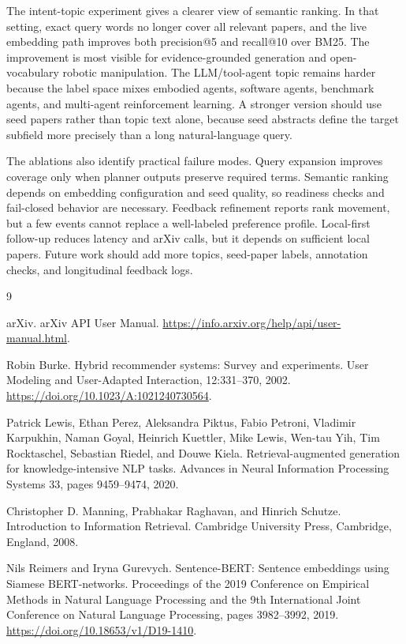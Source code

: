 \documentclass{article}
\begin{document}
The intent-topic experiment gives a clearer view of semantic ranking. In that setting, exact query words no longer cover all relevant papers, and the live embedding path improves both precision@5 and recall@10 over BM25. The improvement is most visible for evidence-grounded generation and open-vocabulary robotic manipulation. The LLM/tool-agent topic remains harder because the label space mixes embodied agents, software agents, benchmark agents, and multi-agent reinforcement learning. A stronger version should use seed papers rather than topic text alone, because seed abstracts define the target subfield more precisely than a long natural-language query.

The ablations also identify practical failure modes. Query expansion improves coverage only when planner outputs preserve required terms. Semantic ranking depends on embedding configuration and seed quality, so readiness checks and fail-closed behavior are necessary. Feedback refinement reports rank movement, but a few events cannot replace a well-labeled preference profile. Local-first follow-up reduces latency and arXiv calls, but it depends on sufficient local papers. Future work should add more topics, seed-paper labels, annotation checks, and longitudinal feedback logs.

\begin{thebibliography}{9}

arXiv.
\newblock arXiv API User Manual.
\newblock \url{https://info.arxiv.org/help/api/user-manual.html}.

Robin Burke.
\newblock Hybrid recommender systems: Survey and experiments.
\newblock User Modeling and User-Adapted Interaction, 12:331--370, 2002.
\newblock \url{https://doi.org/10.1023/A:1021240730564}.

Patrick Lewis, Ethan Perez, Aleksandra Piktus, Fabio Petroni, Vladimir Karpukhin, Naman Goyal, Heinrich Kuettler, Mike Lewis, Wen-tau Yih, Tim Rocktaschel, Sebastian Riedel, and Douwe Kiela.
\newblock Retrieval-augmented generation for knowledge-intensive NLP tasks.
\newblock Advances in Neural Information Processing Systems 33, pages 9459--9474, 2020.

Christopher D. Manning, Prabhakar Raghavan, and Hinrich Schutze.
\newblock Introduction to Information Retrieval.
\newblock Cambridge University Press, Cambridge, England, 2008.

Nils Reimers and Iryna Gurevych.
\newblock Sentence-BERT: Sentence embeddings using Siamese BERT-networks.
\newblock Proceedings of the 2019 Conference on Empirical Methods in Natural Language Processing and the 9th International Joint Conference on Natural Language Processing, pages 3982--3992, 2019.
\newblock \url{https://doi.org/10.18653/v1/D19-1410}.

\end{thebibliography}
\end{document}
